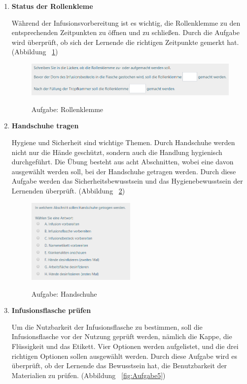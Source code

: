 \begin{enumerate}
    \item \textbf{Status der Rollenkleme}
    
    Während der Infusionsvorbereitung ist es wichtig, die Rollenklemme zu den entsprechenden Zeitpunkten zu öffnen und zu schließen. Durch die Aufgabe wird überprüft, ob sich der Lernende die richtigen Zeitpunkte gemerkt hat. (Abbildung ~\ref{fig:Aufgabe3})
    
\begin{figure}[ht]
\vspace*{1em}
\centering
\caption{Aufgabe: Rollenklemme}
\includegraphics[width= \textwidth]{images/Aufgabe3.png}
\label{fig:Aufgabe3} 
\end{figure}
    
    \item \textbf{Handschuhe tragen}
    
    
    Hygiene und Sicherheit sind wichtige Themen. Durch Handschuhe werden nicht nur die Hände geschützt, sondern auch die Handlung hygienisch durchgeführt. Die Übung besteht aus acht Abschnitten, wobei eine davon ausgewählt werden soll, bei der  Handschuhe getragen werden. Durch diese Aufgabe werden das Sicherheitsbewusstsein und das Hygienebewusstsein der Lernenden überprüft. (Abbildung ~\ref{fig:Aufgabe4})
    
\begin{figure}[ht]
\vspace*{1em}
\centering
\caption{Aufgabe: Handschuhe}
\includegraphics[width= 0.5\textwidth]{images/Aufgabe4.png}
\label{fig:Aufgabe4} 
\end{figure}
    
    \item \textbf{Infusionsflasche prüfen}
    
    Um die Nutzbarkeit der Infusionsflasche zu bestimmen, soll die Infusionsflasche vor der Nutzung geprüft werden, nämlich die Kappe, die Flüssigkeit und das Etikett. Vier Optionen werden aufgelistet, und die drei richtigen Optionen sollen ausgewählt werden. Durch diese Aufgabe wird es überprüft, ob der Lernende das Bewusstsein hat, die Benutzbarkeit der Materialien zu prüfen. (Abbildung ~\ref{fig:Aufgabe5})
    

\end{enumerate}
